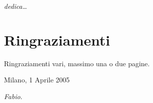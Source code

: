 \begin{flushright}
\Large\textit{dedica\dots}
\end{flushright}


\cleardoublepage

\thispagestyle{empty}

\chapter*{Ringraziamenti}
Ringraziamenti vari, massimo una o due pagine.

\begin{flushleft}
Milano, 1 Aprile 2005
\end{flushleft}

\begin{flushright}
\emph{Fabio.}
\end{flushright}

\cleardoublepage
\thispagestyle{empty}